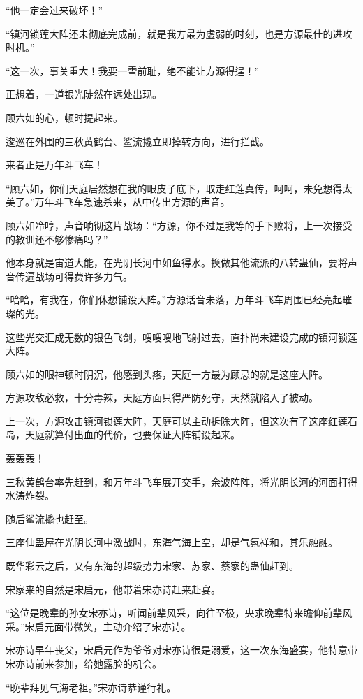 \begin{this_body}
“他一定会过来破坏！”

“镇河锁莲大阵还未彻底完成前，就是我方最为虚弱的时刻，也是方源最佳的进攻时机。”

“这一次，事关重大！我要一雪前耻，绝不能让方源得逞！”

正想着，一道银光陡然在远处出现。

顾六如的心，顿时提起来。

逡巡在外围的三秋黄鹤台、鲨流撬立即掉转方向，进行拦截。

来者正是万年斗飞车！

“顾六如，你们天庭居然想在我的眼皮子底下，取走红莲真传，呵呵，未免想得太美了。”万年斗飞车急速杀来，从中传出方源的声音。

顾六如冷哼，声音响彻这片战场：“方源，你不过是我等的手下败将，上一次接受的教训还不够惨痛吗？”

他本身就是宙道大能，在光阴长河中如鱼得水。换做其他流派的八转蛊仙，要将声音传遍战场可得费许多力气。

“哈哈，有我在，你们休想铺设大阵。”方源话音未落，万年斗飞车周围已经亮起璀璨的光。

这些光交汇成无数的银色飞剑，嗖嗖嗖地飞射过去，直扑尚未建设完成的镇河锁莲大阵。

顾六如的眼神顿时阴沉，他感到头疼，天庭一方最为顾忌的就是这座大阵。

方源攻敌必救，十分毒辣，天庭方面只得严防死守，天然就陷入了被动。

上一次，方源攻击镇河锁莲大阵，天庭可以主动拆除大阵，但这次有了这座红莲石岛，天庭就算付出血的代价，也要保证大阵铺设起来。

轰轰轰！

三秋黄鹤台率先赶到，和万年斗飞车展开交手，余波阵阵，将光阴长河的河面打得水涛炸裂。

随后鲨流撬也赶至。

三座仙蛊屋在光阴长河中激战时，东海气海上空，却是气氛祥和，其乐融融。

既华彩云之后，又有东海的超级势力宋家、苏家、蔡家的蛊仙赶到。

宋家来的自然是宋启元，他带着宋亦诗赶来赴宴。

“这位是晚辈的孙女宋亦诗，听闻前辈风采，向往至极，央求晚辈特来瞻仰前辈风采。”宋启元面带微笑，主动介绍了宋亦诗。

宋亦诗早年丧父，宋启元作为爷爷对宋亦诗很是溺爱，这一次东海盛宴，他特意带宋亦诗前来参加，给她露脸的机会。

“晚辈拜见气海老祖。”宋亦诗恭谨行礼。


\end{this_body}

